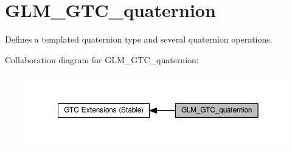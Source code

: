 \hypertarget{group__gtc__quaternion}{}\section{G\+L\+M\+\_\+\+G\+T\+C\+\_\+quaternion}
\label{group__gtc__quaternion}


Defines a templated quaternion type and several quaternion operations.  


Collaboration diagram for G\+L\+M\+\_\+\+G\+T\+C\+\_\+quaternion\+:\nopagebreak
\begin{figure}[H]
\begin{center}
\leavevmode
\includegraphics[width=350pt]{group__gtc__quaternion}
\end{center}
\end{figure}
